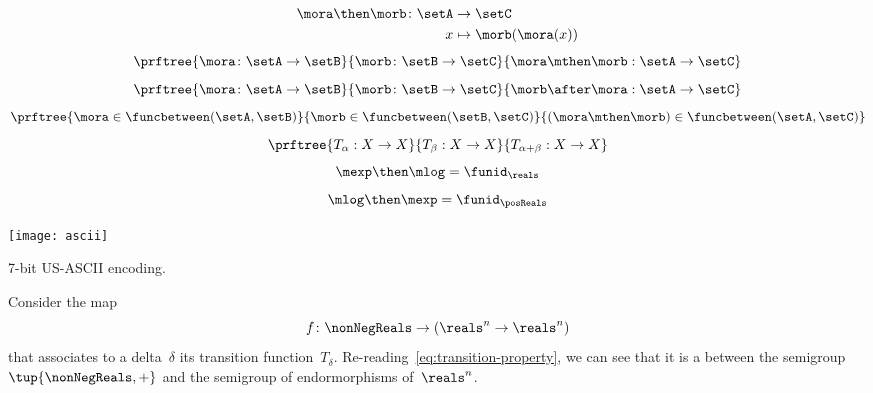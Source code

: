 {\begin{forslides}
\begin{equation}
            \label{eq:funcomposition}
            \begin{aligned}
                \mora \then \morb \colon \setA & \to  \setC              \\
                x                              & \mapsto \morb(\mora(x))
            \end{aligned}
        \end{equation}
        \begin{equation}
            \label{eq:funccomp1}
            \prftree{\mora \colon \setA \to \setB}{\morb \colon \setB \to \setC}{\mora \mthen \morb : \setA \to \setC}
        \end{equation}
        \begin{equation}
            \label{eq:funccomp2}
            \prftree{\mora \colon \setA \to \setB}{\morb \colon \setB \to \setC}{\morb \after \mora : \setA \to \setC}
        \end{equation}
        \begin{equation}
            \label{eq:funccomp3}
            \prftree{%
                \mora \in \funcbetween(\setA, \setB)}{%
                \morb \in \funcbetween( \setB, \setC)}{
                (\mora \mthen \morb) \in \funcbetween( \setA, \setC)}
        \end{equation}
        \begin{equation}
            \label{eq:transitions}
            \prftree{T_\alpha: X \to X }{T_\beta : X \to X}{T_{\alpha+\beta} : X \to X}
        \end{equation}
        \begin{equation}
            \label{eq:explogid}
            \mexp \then \mlog = \funid_{\reals}
        \end{equation}
        \begin{equation}
            \label{eq:logexpid}
            \mlog \then \mexp = \funid_{\posReals}
        \end{equation}
    \end{forslides}
}%

\begin{marginfigure}
    \texttt{[image: ascii]}
    \caption{7-bit US-ASCII encoding. \label{fig:asciifigure}}
\end{marginfigure}

\begin{example}
    Consider the map
    \begin{equation}
        f\colon \nonNegReals \to (\reals^n \to \reals^n)
    \end{equation}
    that associates to a delta~$\delta$ its transition function~$T_\delta$.
    Re-reading~\cref{eq:transition-property}, we can see that it is a \whomo between the semigroup~$\tup{\nonNegReals,+}$ and the semigroup of endormorphisms of~$\reals^n$.
\end{example}

